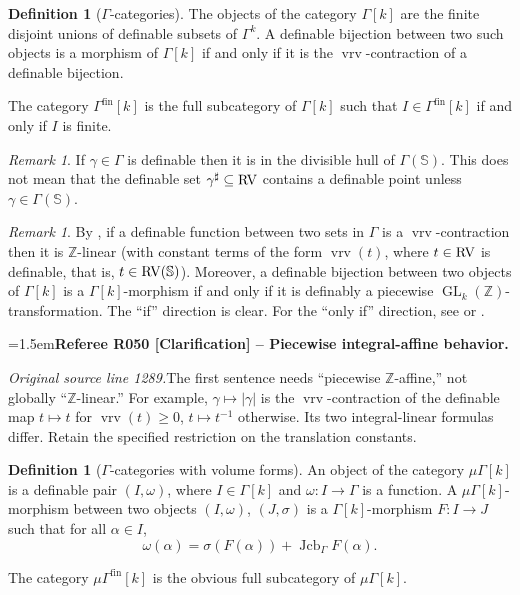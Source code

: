 \documentclass[12pt]{amsart}
\newcommand{\RefereeRemark}[4]{%
  \par\medskip\begingroup\normalfont\small\color{RefereePurple}%
  \emergencystretch=1.5em\noindent\textbf{Referee R#1 [#2] -- #3.}\par\nobreak\noindent #4\par
  \endgroup\medskip
}
\theoremstyle{plain}
\theoremstyle{definition}
\newtheorem{defn}[thm]{Definition}
\theoremstyle{remark}
\newtheorem{rem}[thm]{Remark}
\numberwithin{equation}{section}
\theoremstyle{plain}
\newcommand{\RV}{\textup{RV}}
\DeclareMathOperator{\mgl}{GL}
\DeclareMathOperator{\jcb}{Jcb}
\newcommand{\Z}{\mathds{Z}}
\newcommand{\0}{\emptyset}
\newcommand{\fun}{\longrightarrow}
\newcommand{\sub}{\subseteq}
\newcommand{\mG}{{\mu}{\Gamma}}
\DeclareMathOperator{\fin}{fin}
\DeclareMathOperator{\vrv}{vrv}
\begin{document}
\begin{defn}[$\Gamma$-categories]\label{def:Ga:cat}
The objects of the category $\Gamma[k]$ are the finite disjoint unions of definable subsets of $\Gamma^k$. A definable bijection between  two such objects is a  morphism of $\Gamma[k]$ if and only if it is the $\vrv$-contraction of a definable bijection.


The category $\Gamma^{\fin}[k]$ is the full subcategory of $\Gamma[k]$ such that $I \in \Gamma^{\fin}[k]$ if and only if $I$ is finite.
\end{defn}

\begin{rem}
If $\gamma \in \Gamma$ is definable then it is in the divisible hull of $\Gamma(\mathbb{S})$. This does not mean that the definable set $\gamma^{\sharp} \sub \RV$ contains a definable point unless $\gamma \in \Gamma(\mathbb{S})$.
\end{rem}


\begin{rem}\label{GLZ:char}
By \cite[Remark~2.28]{Yin:int:expan:acvf}, if a definable function between two sets in $\Gamma$ is a $\vrv$-contraction then it is $\Z$-linear (with constant terms of the form $\vrv(t)$, where $t \in \RV$ is definable, that is, $t \in \RV(\mathbb{S})$). Moreover,  a definable bijection  between two objects of $\Gamma[k]$ is a  $\Gamma[k]$-morphism if and only if it is definably a piecewise $\mgl_k(\Z)$-transformation. The ``if'' direction is clear. For the ``only if'' direction, see \cite[Lemma~10.1]{hrushovski:kazhdan:integration:vf} or \cite[Lemma~2.29]{Yin:int:expan:acvf}.

\RefereeRemark{050}{Clarification}{Piecewise integral-affine behavior}{%
\textit{Original source line 1289.}\quad The first sentence needs ``piecewise $\mathbb Z$-affine,'' not globally ``$\mathbb Z$-linear.'' For example, $\gamma\mapsto |\gamma|$ is the $\vrv$-contraction of the definable map $t\mapsto t$ for $\vrv(t)\geq0$, $t\mapsto t^{-1}$ otherwise. Its two integral-linear formulas differ. Retain the specified restriction on the translation constants.
}
\end{rem}


\begin{defn}[$\Gamma$-categories with volume forms]\label{def:Ga:cat:mu}
An object of the category $\mG[k]$ is a definable pair $(I, \omega)$, where $I \in \Gamma[k]$ and $\omega : I \fun \Gamma$ is a function. A $\mG[k]$-morphism between two objects $(I, \omega)$, $(J, \sigma)$ is a $\Gamma[k]$-morphism $F : I \fun J$ such that for all $\alpha  \in I$,
\[
\omega(\alpha) = \sigma(F(\alpha)) + \jcb_{\Gamma} F(\alpha).
\]

The category $\mG^{\fin}[k]$ is the obvious full subcategory of $\mG[k]$.
\end{defn}
\end{document}
